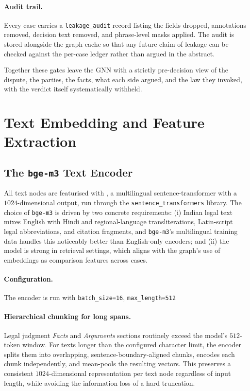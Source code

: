 \paragraph{Audit trail.} Every case carries a \texttt{leakage\_audit}
record listing the fields dropped, annotations removed, decision text
removed, and phrase-level masks applied. The audit is stored alongside
the graph cache so that any future claim of leakage can be checked
against the per-case ledger rather than argued in the abstract.

Together these gates leave the GNN with a strictly pre-decision view
of the dispute, the parties, the facts, what each side argued, and
the law they invoked, with the verdict itself systematically
withheld.

\section{Text Embedding and Feature Extraction}
\label{sec:text_features}

\subsection{The \texttt{bge-m3} Text Encoder}

All text nodes are featurised with , a multilingual
sentence-transformer with a $1024$-dimensional output, run through the
\texttt{sentence\_transformers} library. The choice of \texttt{bge-m3}
is driven by two concrete requirements: (i) Indian legal text mixes
English with Hindi and regional-language transliterations, Latin-script
legal abbreviations, and citation fragments, and \texttt{bge-m3}'s
multilingual training data handles this noticeably better than
English-only encoders; and (ii) the model is strong in retrieval
settings, which aligns with the graph's use of embeddings as
comparison features across cases.

\paragraph{Configuration.} The encoder is run with
\texttt{batch\_size=16}, \texttt{max\_length=512}

\paragraph{Hierarchical chunking for long spans.} Legal judgment
\emph{Facts} and \emph{Arguments} sections routinely exceed the
model's $512$-token window. For texts longer than the configured
character limit, the encoder splits them into overlapping,
sentence-boundary-aligned chunks, encodes each chunk independently,
and mean-pools the resulting vectors. This preserves a consistent
$1024$-dimensional representation per text node regardless of input
length, while avoiding the information loss of a hard truncation.

